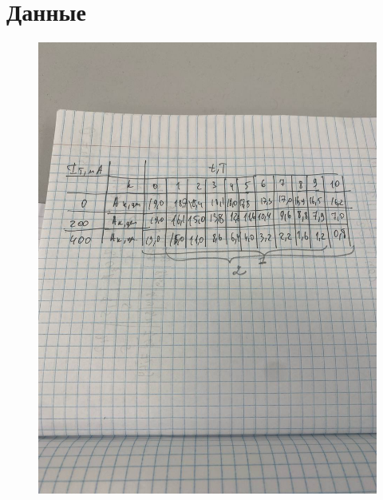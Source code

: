 \documentclass[a4paper]{article}
\begin{document}
\section{\textbf{Данные}}


\begin{figure}[H]
\begin{center}
	\includegraphics[scale=0.15]{data_1.png}

\end{center}
\end{figure}
\end{document}
